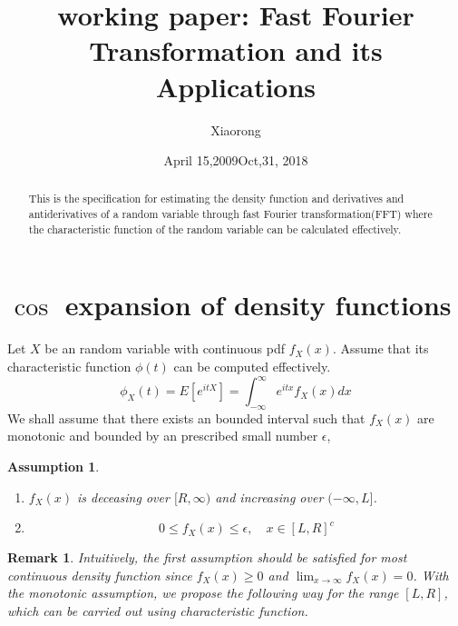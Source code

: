 \documentclass[numreferences]{kluwer}    %
\newtheorem{Ass}[Thm]{Assumption}
\newtheorem{Rem}{Remark}
\begin{document}
\begin{article}
\begin{opening}
\date{April 15,2009}
\title{working paper: Fast Fourier Transformation and its Applications}
\author{Xiaorong }

\date{Oct,31, 2018}
 
\begin{abstract}
This is the specification for estimating the density function and derivatives and antiderivatives  of a random variable through fast Fourier transformation(FFT) where the characteristic function of the random variable can be calculated effectively.
\end{abstract}
\end{opening}
\section{$\cos$ expansion of density functions}
Let $X$ be an random variable with continuous pdf $f_X(x)$. Assume
that its characteristic function $\phi(t)$ can be computed
effectively.
\begin{equation}\label{phi}
\phi_X(t)=E[e^{itX}]=\int^{\infty}_{-\infty}e^{itx}f_X(x)dx
\end{equation}
We shall assume that there exists an bounded interval such that
$f_X(x)$ are monotonic and bounded by an prescribed small number
$\epsilon$,
\begin{Ass}
\begin{enumerate}
\item $f_X(x)$ is deceasing over $[R,\infty)$ and increasing over
$(-\infty,L]$.
\item
\[
0\le f_X(x)\le \epsilon, \quad x\in [L,R]^c
\]
\end{enumerate}
\end{Ass}
\begin{Rem} Intuitively, the first assumption should be satisfied for most
continuous density function since $f_X(x)\ge 0$ and $\lim_{x\to
\infty}f_X(x)=0$. With the monotonic assumption, we propose the
following way for the range $[L,R]$, which can be carried out using
characteristic function.


\end{Rem}
\end{article}
\end{document}

